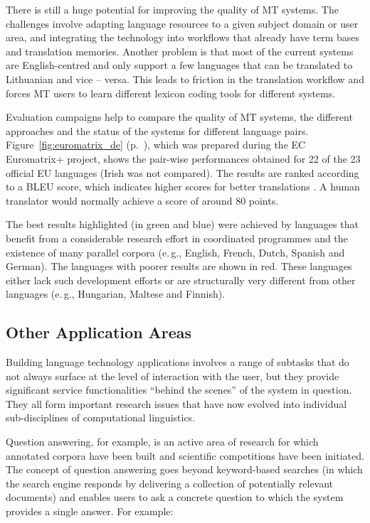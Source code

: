 \begin{multicols}{2}
There is still a huge potential for improving the quality of MT systems. The challenges involve adapting language resources to a given subject domain or user area, and integrating the technology into workflows that already have term bases and translation memories. Another problem is that most of the current systems are English-centred and only support a few languages that can be translated to Lithuanian and vice -- versa. This leads to friction in the translation workflow and forces MT users to learn different lexicon coding tools for different systems.

Evaluation campaigns help to compare the quality of MT systems, the different approaches and the status of the systems for different language pairs. Figure~\ref{fig:euromatrix_de} (p.~\pageref{fig:euromatrix_de}), which was prepared during the EC Euromatrix+ project, shows the pair-wise performances obtained for 22 of the 23 official EU languages (Irish was not compared). The results are ranked according to a BLEU score, which indicates higher scores for better translations \cite{bleu1}. A human translator would normally achieve a score of around 80 points.

The best results highlighted (in green and blue) were achieved by languages that benefit from a considerable research effort in coordinated programmes and the existence of many parallel corpora (e.\,g., English, French, Dutch, Spanish and German). The languages with poorer results are shown in red. These languages either lack such development efforts or are structurally very different from other languages (e.\,g., Hungarian, Maltese and Finnish).


\subsection{Other Application Areas}

Building language technology applications involves a range of subtasks that do not always surface at the level of interaction with the user, but they provide significant service functionalities “behind the scenes” of the system in question. They all form important research issues that have now evolved into individual sub-disciplines of computational linguistics. 

 Question answering, for example, is an active area of research for which annotated corpora have been built and scientific competitions have been initiated. The concept of question answering goes beyond keyword-based searches (in which the search engine responds by delivering a collection of potentially relevant documents) and enables users to ask a concrete question to which the system provides a single answer. For example:


\end{multicols}
